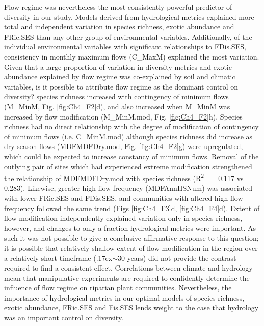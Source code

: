 \documentclass[openright,12pt,a4paper]{memoir}
\begin{document}
Flow regime was nevertheless the most consistently powerful predictor of diversity in our study. Models derived from hydrological metrics explained more total and independent variation in species richness, exotic abundance and FRic.SES than any other group of environmental variables. Additionally, of the individual environmental variables with significant relationships to FDis.SES, consistency in monthly maximum flows (C\_MaxM) explained the most variation. 
Given that a large proportion of variation in diversity metrics and exotic abundance explained by flow regime was co-explained by soil and climatic variables, is it possible to attribute flow regime as the dominant control on diversity? species richness increased with contingency of minimum flows (M\_MinM, Fig. \ref{fig:Ch4_F2}d), and also increased when M\_MinM was increased by flow modification (M\_MinM.mod, Fig. \ref{fig:Ch4_F2}h). Species richness had no direct relationship with the degree of modification of contingency of minimum flows (i.e. C\_MinM.mod) although species richness did increase as dry season flows (MDFMDFDry.mod, Fig. \ref{fig:Ch4_F2}g) were upregulated, which could be expected to increase constancy of minimum flows. Removal of the outlying pair of sites which had experienced extreme modification strengthened the relationship of MDFMDFDry.mod with species richness (R\textsuperscript{2}  $=$ 0.117 vs 0.283). Likewise, greater high flow frequency (MDFAnnHSNum) was associated with lower FRic.SES and FDis.SES, and communities with altered high flow frequency followed the same trend (Figs \ref{fig:Ch4_F3}d, \ref{fig:Ch4_F4}d). Extent of flow modification independently explained variation only in species richness, however, and changes to only a fraction hydrological metrics were important. As such it was not possible to give a conclusive affirmative response to this question; it is possible that relatively shallow extent of flow modification in the region over a relatively short timeframe ({\raise.17ex\hbox{$\scriptstyle\mathtt{\sim}$}}30 years) \citep{Mackay2014} did not provide the contrast required to find a consistent effect. Correlations between climate and hydrology mean that manipulative experiments are required to confidently determine the influence of flow regime on riparian plant communities. Nevertheless, the importance of hydrological metrics in our optimal models of species richness, exotic abundance, FRic.SES and Fis.SES lends weight to the case that hydrology was an important control on diversity. 
\end{document}
